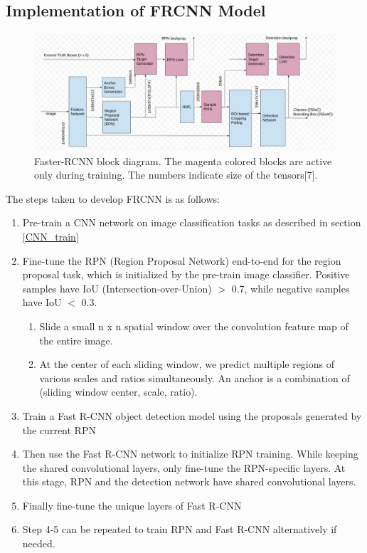 \documentclass[12pt]{article}
\begin{document}
\subsection{Implementation of FRCNN Model}
\begin{figure}[H]
\centering
  \includegraphics[width=\linewidth]{./Images/FRCNN_model.png}
  \caption{Faster-RCNN block diagram. The magenta colored blocks are active only during training. The numbers indicate size of the tensors[7].}
  \label{fig:FRCNN_model}
\end{figure}

The steps taken to develop FRCNN is as follows:
\begin{enumerate}
	\item Pre-train a CNN network on image classification tasks as described in section \ref{CNN_train}
	\item Fine-tune the RPN (Region Proposal Network) end-to-end for the region proposal task, which is initialized by the pre-train image classifier. Positive samples have IoU (Intersection-over-Union) $>$ 0.7, while negative samples have IoU $<$ 0.3. 
	\begin{enumerate}
		\item Slide a small n x n spatial window over the convolution feature map of the entire image.
		\item At the center of each sliding window, we predict multiple regions of various scales and ratios simultaneously. An anchor is a combination of (sliding window center, scale, ratio). 
	\end{enumerate}
	\item Train a Fast R-CNN object detection model using the proposals generated by the current RPN
	\item Then use the Fast R-CNN network to initialize RPN training. While keeping the shared convolutional layers, only fine-tune the RPN-specific layers. At this stage, RPN and the detection network have shared convolutional layers.
	\item Finally fine-tune the unique layers of Fast R-CNN
	\item Step 4-5 can be repeated to train RPN and Fast R-CNN alternatively if needed.
\end{enumerate}
\end{document}
